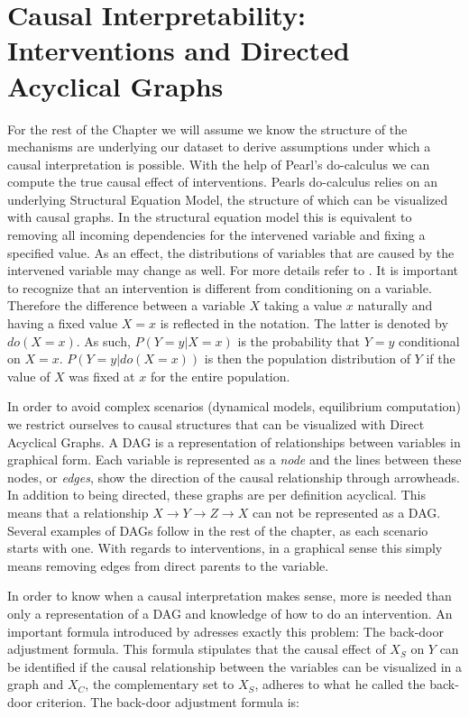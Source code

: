 \documentclass[]{krantz}
\begin{document}
\section{Causal Interpretability: Interventions and Directed Acyclical
Graphs}\label{causal-interpretability-interventions-and-directed-acyclical-graphs}

For the rest of the Chapter we will assume we know the structure of the
mechanisms are underlying our dataset to derive assumptions under which
a causal interpretation is possible. With the help of Pearl's
do-calculus \citep{pearl1993} we can compute the true causal effect of
interventions. Pearls do-calculus relies on an underlying Structural
Equation Model, the structure of which can be visualized with causal
graphs. In the structural equation model this is equivalent to removing
all incoming dependencies for the intervened variable and fixing a
specified value. As an effect, the distributions of variables that are
caused by the intervened variable may change as well. For more details
refer to \citep{pearl1993}. It is important to recognize that an
intervention is different from conditioning on a variable. Therefore the
difference between a variable \(X\) taking a value \(x\) naturally and
having a fixed value \(X=x\) is reflected in the notation. The latter is
denoted by \(do(X=x)\). As such, \(P(Y=y|X=x)\) is the probability that
\(Y=y\) conditional on \(X=x\). \(P(Y=y|do(X=x))\) is then the
population distribution of \(Y\) if the value of \(X\) was fixed at
\(x\) for the entire population.

In order to avoid complex scenarios (dynamical models, equilibrium
computation) we restrict ourselves to causal structures that can be
visualized with Direct Acyclical Graphs. A DAG is a representation of
relationships between variables in graphical form. Each variable is
represented as a \emph{node} and the lines between these nodes, or
\emph{edges}, show the direction of the causal relationship through
arrowheads. In addition to being directed, these graphs are per
definition acyclical. This means that a relationship
\(X \rightarrow Y \rightarrow Z \rightarrow X\) can not be represented
as a DAG. Several examples of DAGs follow in the rest of the chapter, as
each scenario starts with one. With regards to interventions, in a
graphical sense this simply means removing edges from direct parents to
the variable.

In order to know when a causal interpretation makes sense, more is
needed than only a representation of a DAG and knowledge of how to do an
intervention. An important formula introduced by \citep{pearl1993}
adresses exactly this problem: The back-door adjustment formula. This
formula stipulates that the causal effect of \(X_S\) on \(Y\) can be
identified if the causal relationship between the variables can be
visualized in a graph and \(X_C\), the complementary set to \(X_S\),
adheres to what he called the back-door criterion. The back-door
adjustment formula is:
\end{document}
